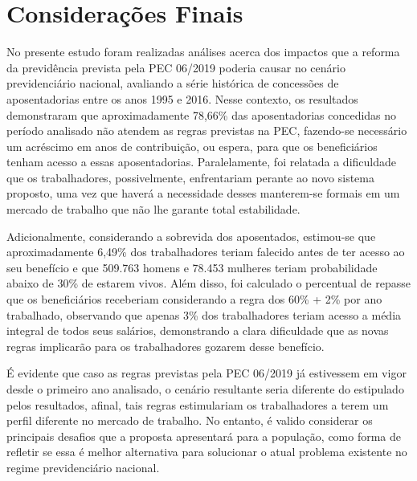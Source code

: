 

\section{Considerações Finais}\label{cap05:conclusoes}

No presente estudo foram realizadas análises acerca dos impactos que a reforma da previdência prevista pela PEC 06/2019 poderia causar no cenário previdenciário nacional, avaliando a série histórica de concessões de aposentadorias entre os anos 1995 e 2016. Nesse contexto, os resultados demonstraram que aproximadamente 78,66\% das aposentadorias concedidas no período analisado não atendem as regras previstas na PEC, fazendo-se necessário um acréscimo em anos de contribuição, ou espera, para que os beneficiários tenham acesso a essas aposentadorias. Paralelamente, foi relatada a dificuldade que os trabalhadores, possivelmente, enfrentariam perante ao novo sistema proposto, uma vez que haverá a necessidade desses manterem-se formais em um mercado de trabalho que não lhe garante total estabilidade.

Adicionalmente, considerando a sobrevida dos aposentados, estimou-se que aproximadamente 6,49\% dos trabalhadores teriam falecido antes de ter acesso ao seu benefício e que 509.763 homens e 78.453 mulheres teriam probabilidade abaixo de 30\% de estarem vivos. Além disso, foi calculado o percentual de repasse que os beneficiários receberiam considerando a regra dos 60\% + 2\% por ano trabalhado, observando que apenas 3\% dos trabalhadores teriam acesso a média integral de todos seus salários, demonstrando a clara dificuldade que as novas regras implicarão para os trabalhadores gozarem desse benefício. 

É evidente que caso as regras previstas pela PEC 06/2019 já estivessem em vigor desde o primeiro ano analisado, o cenário resultante seria diferente do estipulado pelos resultados, afinal, tais regras estimulariam os trabalhadores a terem um perfil diferente no mercado de trabalho. No entanto, é valido considerar os principais desafios que a proposta apresentará para a população, como forma de refletir se essa é melhor alternativa para solucionar o atual problema existente no regime previdenciário nacional.
